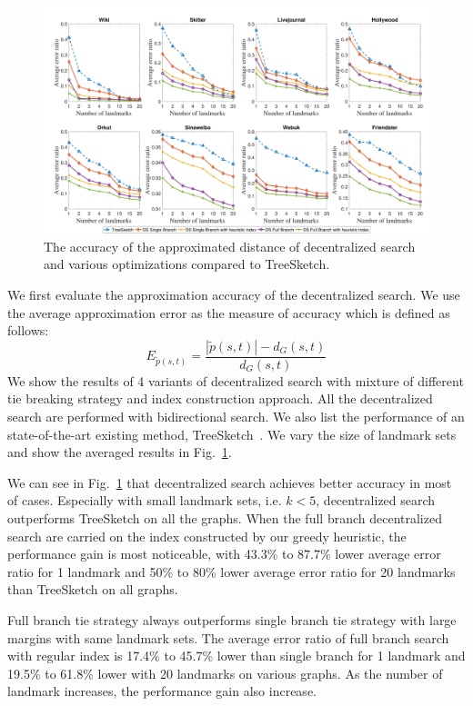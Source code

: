 \begin{figure}[t]
    \centering
    \includegraphics[width=\linewidth]{./figures/accuracy_stepy.pdf}
    \caption{The accuracy of the approximated distance of decentralized search and various optimizations compared to TreeSketch.}
    \label{fig:accuracy_stepy}
\end{figure}

We first evaluate the approximation accuracy of the decentralized search. We use the average approximation error as the measure of accuracy which is defined as follows:
\[
E_{\tilde{p}(s,t)} = \frac{|\tilde{p}(s,t)| - d_G(s,t)}{d_G(s,t)}
\]
We show the results of 4 variants of decentralized search with mixture of different tie breaking strategy and index construction approach. All the decentralized search are performed with bidirectional search. We also list the performance of an state-of-the-art existing method, TreeSketch~\cite{Gubichev:2010:FAE:1871437.1871503}. We vary the size of landmark sets and show the averaged results in Fig.~\ref{fig:accuracy_stepy}.

We can see in Fig.~\ref{fig:accuracy_stepy} that decentralized search achieves better accuracy in most of cases. Especially with small landmark sets, i.e. $k < 5$, decentralized search outperforms TreeSketch on all the graphs. When the full branch decentralized search are carried on the index constructed by our greedy heuristic, the performance gain is most noticeable, with 43.3\% to 87.7\% lower average error ratio for 1 landmark and 50\% to 80\% lower average error ratio for 20 landmarks than TreeSketch on all graphs.

Full branch tie strategy always outperforms single branch tie strategy with large margins with same landmark sets. The average error ratio of full branch search with regular index is 17.4\% to 45.7\% lower than single branch for 1 landmark and 19.5\% to 61.8\% lower with 20 landmarks on various graphs. As the number of landmark increases, the performance gain also increase.   

